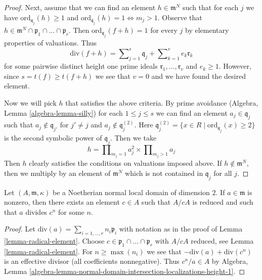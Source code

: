 \begin{proof}
\medskip\noindent
Next, assume that we can find an element $h \in \mathfrak m^N$ such that
for each $j$ we have $\text{ord}_{\mathfrak q_j}(h) \geq 1$ and
$\text{ord}_{\mathfrak q_j}(h) = 1 \Leftrightarrow m_j > 1$.
Observe that
$h \in \mathfrak m^N \cap \mathfrak p_1 \cap \ldots \cap \mathfrak p_r$.
Then $\text{ord}_{\mathfrak q_j}(f + h) = 1$
for every $j$ by elementary properties of valuations.
Thus
$$
\text{div}(f + h) = \sum\nolimits_{j = 1}^s \mathfrak q_j +
\sum\nolimits_{k = 1}^v e_k \mathfrak r_k
$$
for some pairwise distinct height one prime ideals
$\mathfrak r_1, \ldots, \mathfrak r_v$ and $e_k \geq 1$.
However, since $s = t(f) \geq t(f + h)$ we see that $v = 0$
and we have found the desired element.

\medskip\noindent
Now we will pick $h$ that satisfies the above criteria.
By prime avoidance (Algebra, Lemma \ref{algebra-lemma-silly})
for each $1 \leq j \leq s$ we can find an element $a_j \in \mathfrak q_j$
such that $a_j \not \in \mathfrak q_{j'}$ for $j' \not = j$
and $a_j \not \in \mathfrak q_j^{(2)}$. Here
$\mathfrak q_j^{(2)} = \{x \in R \mid \text{ord}_{\mathfrak q_j}(x) \geq 2\}$
is the second symbolic power of $\mathfrak q_j$.
Then we take
$$
h = \prod\nolimits_{m_j = 1} a_j^2 \times
\prod\nolimits_{m_j > 1} a_j
$$
Then $h$ clearly satisfies the conditions on valuations imposed above.
If $h \not \in \mathfrak m^N$, then we multiply by an element of
$\mathfrak m^N$ which is not contained in $\mathfrak q_j$ for all $j$.
\end{proof}

\begin{lemma}
\label{lemma-divides-radical}
Let $(A, \mathfrak m, \kappa)$ be a Noetherian normal local domain
of dimension $2$. If $a \in \mathfrak m$ is nonzero, then there exists an
element $c \in A$ such that $A/cA$ is reduced and such that $a$ divides
$c^n$ for some $n$.
\end{lemma}

\begin{proof}
Let $\text{div}(a) = \sum_{i = 1, \ldots, r} n_i \mathfrak p_i$
with notation as in the proof of Lemma \ref{lemma-radical-element}.
Choose $c \in \mathfrak p_1 \cap \ldots \cap \mathfrak p_r$ with $A/cA$
reduced, see Lemma \ref{lemma-radical-element}. For $n \geq \max(n_i)$
we see that $-\text{div}(a) + \text{div}(c^n)$
is an effective divisor (all coefficients nonnegative).
Thus $c^n/a \in A$ by Algebra, Lemma
\ref{algebra-lemma-normal-domain-intersection-localizations-height-1}.
\end{proof}

